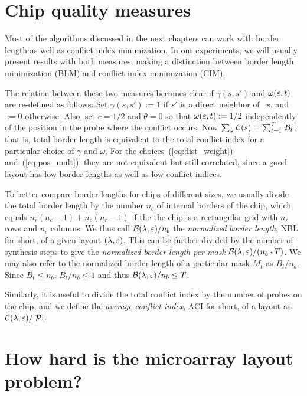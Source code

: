 \section{Chip quality measures}
\label{sec:mlp_bl_vs_ci}

Most of the algorithms discussed in the next chapters can work with border
length as well as conflict index minimization. In our experiments, we will
usually present results with both measures, making a distinction between border
length minimization (BLM) and conflict index minimization (CIM).

The relation between these two
measures becomes clear if $\gamma(s,s')$ and $\omega(\varepsilon,t)$ are re-defined as
follows: Set $\gamma(s,s') := 1$ if $s'$ is a direct neighbor of~ $s$, and $:=0$
otherwise. Also, set $c=1/2$ and $\theta=0$ so that $\omega(\varepsilon,t) := 1/2$
independently of the position in the probe where the conflict occurs. Now
$\sum_s\, {\mathcal{C}}(s) = \sum_{t=1}^T\, {\mathcal{B}}_t$; that is, total border length is
equivalent to the total conflict index for a particular choice of $\gamma$ and
$\omega$. For the choices~(\ref{eq:dist_weight}) and~(\ref{eq:pos_mult}), they
are not equivalent but still correlated, since a good layout has low border
lengths as well as low conflict indices.

To better compare border lengths for chips of different sizes, we usually divide
the total border length by the number $n_b$ of internal borders of the chip,
which equals $n_r(n_c - 1) + n_c(n_r - 1)$ if the the chip is a rectangular grid
with $n_r$ rows and $n_c$ columns. We thus call ${\mathcal{B}}(\lambda,\varepsilon)/n_b$ the
\emph{normalized border length}, NBL for short, of a given layout
$(\lambda,\varepsilon)$. This can be further divided by the number of synthesis steps
to give the \emph{normalized border length per mask}
${\mathcal{B}}(\lambda,\varepsilon)/(n_b \cdot T)$. We may also refer to the normalized border
length of a particular mask $M_t$ as $B_t/n_b$. Since $B_t \leq n_b$,
$B_t/n_b \leq 1$ and thus ${\mathcal{B}}(\lambda,\varepsilon)/n_b \leq T$.

Similarly, it is useful to divide the total conflict index by the number of
probes on the chip, and we define the \emph{average conflict index}, ACI for
short, of a layout as ${\mathcal{C}}(\lambda,\varepsilon)/|{\mathcal{P}}|$.

\section{How hard is the microarray layout problem?}
\label{sec:mlp_how_hard}

